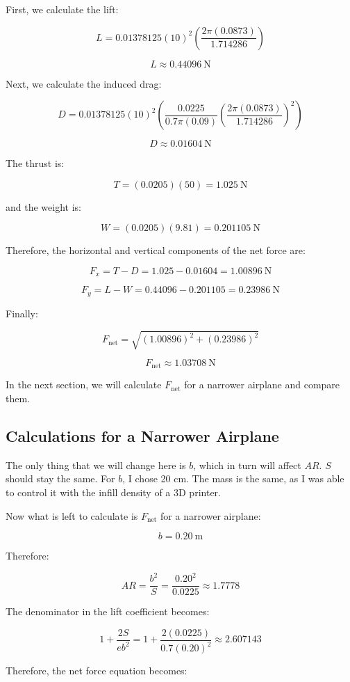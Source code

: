 \documentclass[12pt]{article}
\begin{document}
First, we calculate the lift:

\[
L=
0.01378125(10)^2
\left(
\frac{2\pi(0.0873)}{1.714286}
\right)
\]

\[
L\approx0.44096\ \mathrm{N}
\]

Next, we calculate the induced drag:

\[
D=
0.01378125(10)^2
\left(
\frac{0.0225}{0.7\pi(0.09)}
\left(
\frac{2\pi(0.0873)}{1.714286}
\right)^2
\right)
\]

\[
D\approx0.01604\ \mathrm{N}
\]

The thrust is:

\[
T=(0.0205)(50)=1.025\ \mathrm{N}
\]

and the weight is:

\[
W=(0.0205)(9.81)=0.201105\ \mathrm{N}
\]

Therefore, the horizontal and vertical components of the net force are:

\[
F_x=T-D=1.025-0.01604=1.00896\ \mathrm{N}
\]

\[
F_y=L-W=0.44096-0.201105=0.23986\ \mathrm{N}
\]

Finally:

\[
F_{\mathrm{net}}
=
\sqrt{(1.00896)^2+(0.23986)^2}
\]

\[
F_{\mathrm{net}}\approx1.03708\ \mathrm{N}
\]

In the next section, we will calculate $F_{\mathrm{net}}$ for a narrower airplane and compare them.

\subsection{Calculations for a Narrower Airplane}

The only thing that we will change here is $b$, which in turn will affect $AR$. $S$ should stay the same. For $b$, I chose 20 cm. The mass is the same, as I was able to control it with the infill density of a 3D printer.

Now what is left to calculate is $F_{\mathrm{net}}$ for a narrower airplane:

\[
b=0.20\ \mathrm{m}
\]

Therefore:

\[
AR=\frac{b^2}{S}
=
\frac{0.20^2}{0.0225}
\approx1.7778
\]

The denominator in the lift coefficient becomes:

\[
1+\frac{2S}{eb^2}
=
1+\frac{2(0.0225)}{0.7(0.20)^2}
\approx2.607143
\]

Therefore, the net force equation becomes:
\end{document}
